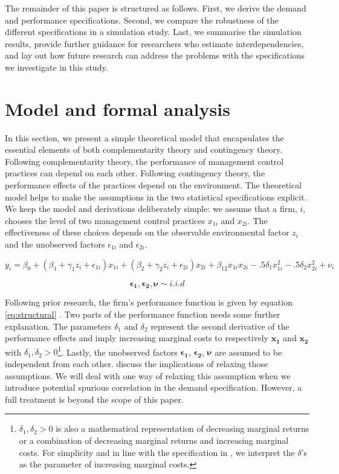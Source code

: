 \documentclass[12pt]{article}
\begin{document}
The remainder of this paper is structured as follows. First, we derive
the demand and performance specifications. Second, we compare the
robustness of the different specifications in a simulation study. Last,
we summarise the simulation results, provide further guidance for
researchers who estimate interdependencies, and lay out how future
research can address the problems with the specifications we investigate
in this study.

\section{Model and formal analysis}\label{model-and-formal-analysis}

In this section, we present a simple theoretical model that encapsulates
the essential elements of both complementarity theory and contingency
theory. Following complementarity theory, the performance of management
control practices can depend on each other. Following contingency
theory, the performance effects of the practices depend on the
environment. The theoretical model helps to make the assumptions in the
two statistical specifications explicit. We keep the model and
derivations deliberately simple: we assume that a firm, \(i\), chooses
the level of two management control practices \(x_{1i}\) and \(x_{2i}\).
The effectiveness of these choices depends on the observable
environmental factor \(z_i\) and the unobserved factors
\(\epsilon_{1i}\) and \(\epsilon_{2i}\).

\begin{equation} \label{eq:structural}
y_i = \beta_0 + (\beta_1 + \gamma_1 z_i + \epsilon_{1i}) x_{1i}
                 + (\beta_2 + \gamma_2 z_i + \epsilon_{2i}) x_{2i}
                 + \beta_{12} x_{1i} x_{2i}
                 - .5 \delta_1 x^2_{1i} - .5 \delta_2 x^2_{2i} + \nu_i
\end{equation}

\[
\mathbf{\epsilon_{1}}, \mathbf{\epsilon_{2}}, \mathbf{\nu} \sim i.i.d
\]

Following prior research, the firm's performance function is given by
equation \eqref{eq:structural} \citep{Gentzkow2007, Kretschmer2012}. Two
parts of the performance function needs some further explanation. The
parameters \(\delta_1\) and \(\delta_2\) represent the second derivative
of the performance effects and imply increasing marginal costs to
respectively \(\mathbf{x_1}\) and \(\mathbf{x_2}\) with
\(\delta_1, \delta_2 > 0\)\footnote{\(\delta_1, \delta_2 > 0\) is also a
  mathematical representation of decreasing marginal returns or a
  combination of decreasing marginal returns and increasing marginal
  costs. For simplicity and in line with the specification in
  \citet{Grabner2013}, we interpret the \(\delta\)'s as the parameter of
  increasing marginal costs.}. Lastly, the unobserved factors
\(\mathbf{\epsilon_{1}}\), \(\mathbf{\epsilon_{2}}\), \(\mathbf{\nu}\)
are assumed to be independent from each other. \citet{Athey1998} discuss
the implications of relaxing those assumptions. We will deal with one
way of relaxing this assumption when we introduce potential spurious
correlation in the demand specification. However, a full treatment is
beyond the scope of this paper.
\end{document}
